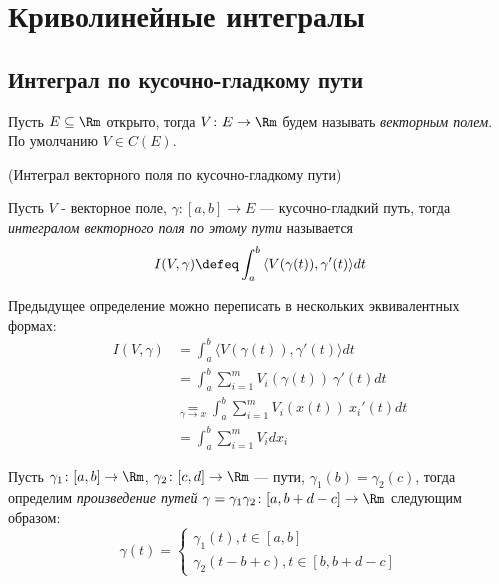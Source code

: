 \chapter{Криволинейные интегралы}

\section{Интеграл по кусочно-гладкому пути}

\begin{definition}
    Пусть $E \subseteq \Rm$ открыто, тогда $V \colon E \to \Rm$ будем
    называть \textit{векторным полем}. По умолчанию $V \in C(E)$.
\end{definition}

\begin{definition}(Интеграл векторного поля по кусочно-гладкому пути)

    Пусть $V$ - векторное поле, $\gamma \colon [a, b] \to E$ --- кусочно-гладкий
    путь, тогда \textit{интегралом векторного поля по этому пути} называется
\[
    I(V, \gamma) \defeq \int_a^b{\langle V(\gamma(t)), \gamma'(t) \rangle dt}
\]
\end{definition}

\begin{remark}
    Предыдущее определение можно переписать в нескольких эквивалентных формах:
\begin{align*}
    I(V, \gamma) &= \int_a^b{\langle V(\gamma(t)), \gamma'(t) \rangle dt}\\
    &= \int_a^b{\sum_{i = 1}^{m}{V_i(\gamma(t)) ~ \gamma'(t)} dt}\\
    &\underset{\gamma \rightarrow x}{=}
    \int_a^b{\sum_{i = 1}^{m}{V_i(x(t)) ~ x_i'(t)} dt}\\
    &= \int_a^b{\sum_{i = 1}^{m}{V_i dx_i}}
\end{align*}
\end{remark}

\begin{definition}
    Пусть $\gamma_1 \colon [a, b] \to \Rm$, $\gamma_2 \colon [c, d] \to \Rm$ ---
    пути, $\gamma_1(b) = \gamma_2(c)$, тогда определим \textit{произведение путей}
    $\gamma = \gamma_1 \gamma_2 \colon [a, b + d - c] \to \Rm$ следующим образом:
\[
    \gamma(t) = \begin{cases}
                    \gamma_1(t), t \in [a, b] \\
                    \gamma_2(t - b + c), t \in [b, b + d - c]
                \end{cases}
\]
\end{definition}

